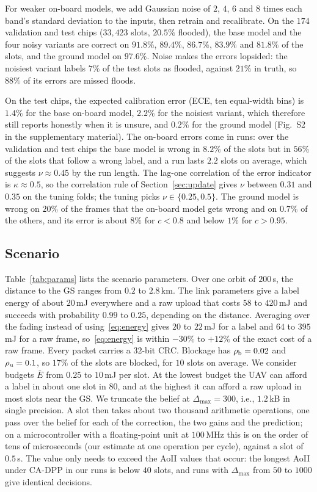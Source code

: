 \documentclass[10pt,journal,compsoc]{IEEEtran}
\theoremstyle{remark}
\begin{document}
For weaker on-board models, we add Gaussian noise of $2$, $4$, $6$ and $8$ times each band's standard deviation to the inputs, then retrain and recalibrate. On the $174$ validation and test chips ($33{,}423$ slots, $20.5\%$ flooded), the base model and the four noisy variants are correct on $91.8\%$, $89.4\%$, $86.7\%$, $83.9\%$ and $81.8\%$ of the slots, and the ground model on $97.6\%$. Noise makes the errors lopsided: the noisiest variant labels $7\%$ of the test slots as flooded, against $21\%$ in truth, so $88\%$ of its errors are missed floods.

On the test chips, the expected calibration error (ECE, ten equal-width bins) is $1.4\%$ for the base on-board model, $2.2\%$ for the noisiest variant, which therefore still reports honestly when it is unsure, and $0.2\%$ for the ground model (Fig.~S2 in the supplementary material). The on-board errors come in runs: over the validation and test chips the base model is wrong in $8.2\%$ of the slots but in $56\%$ of the slots that follow a wrong label, and a run lasts $2.2$ slots on average, which suggests $\nu\approx0.45$ by the run length. The lag-one correlation of the error indicator is $\kappa\approx0.5$, so the correlation rule of Section~\ref{sec:update} gives $\nu$ between $0.31$ and $0.35$ on the tuning folds; the tuning picks $\nu\in\{0.25,0.5\}$. The ground model is wrong on $20\%$ of the frames that the on-board model gets wrong and on $0.7\%$ of the others, and its error is about $8\%$ for $c<0.8$ and below $1\%$ for $c>0.95$.

\subsection{Scenario}
Table~\ref{tab:params} lists the scenario parameters. Over one orbit of $200$\,s, the distance to the GS ranges from $0.2$ to $2.8$\,km. The link parameters give a label energy of about $20$\,mJ everywhere and a raw upload that costs $58$ to $420$\,mJ and succeeds with probability $0.99$ to $0.25$, depending on the distance. Averaging over the fading instead of using~\eqref{eq:energy} gives $20$ to $22$\,mJ for a label and $64$ to $395$\,mJ for a raw frame, so~\eqref{eq:energy} is within $-30\%$ to $+12\%$ of the exact cost of a raw frame. Every packet carries a $32$-bit CRC. Blockage has $\rho_{\rm b}=0.02$ and $\rho_{\rm u}=0.1$, so $17\%$ of the slots are blocked, for $10$ slots on average. We consider budgets $\bar E$ from $0.25$ to $10$\,mJ per slot. At the lowest budget the UAV can afford a label in about one slot in $80$, and at the highest it can afford a raw upload in most slots near the GS. We truncate the belief at $\Delta_{\max}=300$, i.e., $1.2$\,kB in single precision. A slot then takes about two thousand arithmetic operations, one pass over the belief for each of the correction, the two gains and the prediction; on a microcontroller with a floating-point unit at $100$\,MHz this is on the order of tens of microseconds (our estimate at one operation per cycle), against a slot of $0.5$\,s. The value only needs to exceed the AoII values that occur: the longest AoII under CA-DPP in our runs is below $40$ slots, and runs with $\Delta_{\max}$ from $50$ to $1000$ give identical decisions.
\end{document}
